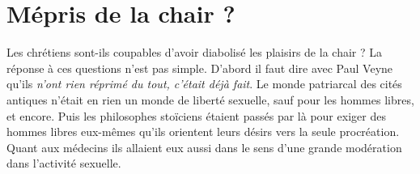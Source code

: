 \section{Mépris de la chair ?}

 Les chrétiens sont-ils coupables d'avoir diabolisé les plaisirs de la chair ? La réponse à ces questions n'est pas simple. D'abord il faut dire avec Paul Veyne qu'ils \emph{n'ont rien réprimé du tout, c'était déjà fait}. Le monde patriarcal des cités antiques n'était en rien un monde de liberté sexuelle, sauf pour les hommes libres, et encore. Puis les philosophes stoïciens étaient passés par là pour exiger des hommes libres eux-mêmes qu'ils orientent leurs désirs vers la seule procréation. Quant aux médecins ils allaient eux aussi dans le sens d'une grande modération dans l'activité sexuelle. 

